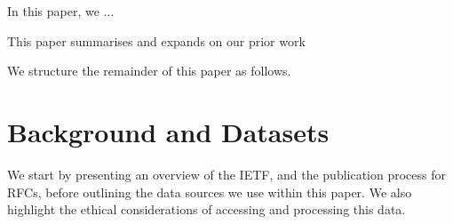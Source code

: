 \documentclass[twocolumn,10pt]{article}
\begin{document}




In this paper, we ...



This paper summarises and expands on our prior work
\cite{mcquistin:2021:characterising,khare:2022:web-we-weave,
healey:2023:power,mcquistin:2023:errare,khare:2023:tracing,
karan:2023:leda,healey:2023:power-frontiers,barnes:2024:temporal}


We structure the remainder of this paper as follows.

\section{Background and Datasets}


We start by presenting an overview of the IETF, and the publication process
for RFCs, before outlining the data sources we use within this paper. We
also highlight the ethical considerations of accessing and processing this
data.
\end{document}

